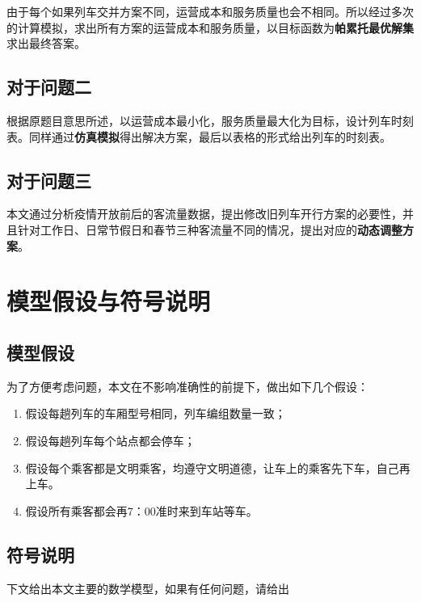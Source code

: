 由于每个如果列车交并方案不同，运营成本和服务质量也会不相同。所以经过多次的计算模拟，求出所有方案的运营成本和服务质量，以目标函数为\textbf{帕累托最优解集}求出最终答案。

\subsection{对于问题二}

根据原题目意思所述，以运营成本最小化，服务质量最大化为目标，设计列车时刻表。同样通过\textbf{仿真模拟}得出解决方案，最后以表格的形式给出列车的时刻表。

\subsection{对于问题三}

本文通过分析疫情开放前后的客流量数据，提出修改旧列车开行方案的必要性，并且针对工作日、日常节假日和春节三种客流量不同的情况，提出对应的\textbf{动态调整方案}。


%
%

\section{模型假设与符号说明}

\subsection{模型假设}

为了方便考虑问题，本文在不影响准确性的前提下，做出如下几个假设：

\begin{enumerate}
    \item 假设每趟列车的车厢型号相同，列车编组数量一致；
    \item 假设每趟列车每个站点都会停车；
    \item 假设每个乘客都是文明乘客，均遵守文明道德，让车上的乘客先下车，自己再上车。
    \item 假设所有乘客都会再7：00准时来到车站等车。
\end{enumerate}

\subsection{符号说明}

下文给出本文主要的数学模型，如果有任何问题，请给出

